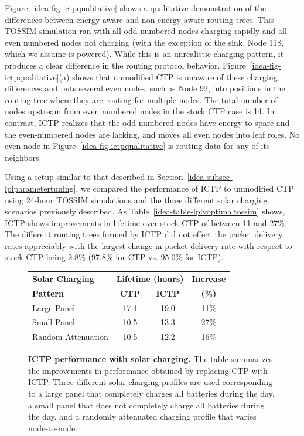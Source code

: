 Figure~\ref{idea-fig-ictpqualitative} shows a qualitative demonstration of
the differences between energy-aware and non-energy-aware routing trees. This
TOSSIM simulation ran with all odd numbered nodes charging rapidly and all
even numbered nodes not charging (with the exception of the sink, Node 118,
which we assume is powered). While this is an unrealistic charging pattern,
it produces a clear difference in the routing protocol behavior.
Figure~\ref{idea-fig-ictpqualitative}(a) shows that unmodified CTP is unaware
of these charging differences and puts several even nodes, such as Node 92,
into positions in the routing tree where they are routing for multiple nodes.
The total number of nodes upstream from even numbered nodes in the stock CTP
case is 14. In contrast, ICTP realizes that the odd-numbered nodes have
energy to spare and the even-numbered nodes are lacking, and moves all even
nodes into leaf roles. No even node in Figure~\ref{idea-fig-ictpqualitative}
is routing data for any of its neighbors.

Using a setup similar to that described in
Section~\ref{idea-subsec-lplparametertuning}, we compared the performance of
ICTP to unmodified CTP using 24-hour TOSSIM simulations and the three
different solar charging scenarios previously described. As
Table~\ref{idea-table-lplvoptimaltossim} shows, ICTP shows improvements in
lifetime over stock CTP of between 11 and 27\%. The different routing trees
formed by ICTP did not effect the packet delivery rates appreciably with the
largest change in packet delivery rate with respect to stock CTP being 2.8\%
(97.8\% for CTP vs. 95.0\% for ICTP).

\begin{figure}[t]
\begin{center}
\begin{tabular}{|l|ccc|}
\hline
\textbf{Solar Charging} & \multicolumn{2}{c}{\textbf{Lifetime (hours)}} & \textbf{Increase} \\
\textbf{Pattern} & \textbf{CTP} & \textbf{ICTP} & \textbf{(\%)} \\ \hline
Large Panel & 17.1 & 19.0 & 11\% \\
Small Panel & 10.5 & 13.3 & 27\% \\
Random Attenuation & 10.5 & 12.2 & 16\% \\ \hline
\end{tabular}
\end{center}

\caption{\textbf{ICTP performance with solar charging.} The table summarizes
the improvements in performance obtained by replacing CTP with ICTP. Three
different solar charging profiles are used corresponding to a large panel
that completely charges all batteries during the day, a small panel that does
not completely charge all batteries during the day, and a randomly attenuated
charging profile that varies node-to-node.}

\label{idea-table-ictpvoptimaltossim}
\end{figure}

